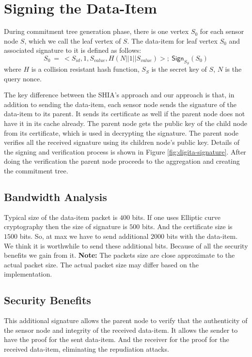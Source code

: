 \section{Signing the Data-Item}
	During commitment tree generation phase, there is one vertex $S_{0}$ for each sensor node $S$, which we call the leaf vertex of $S$.
	The data-item for leaf vertex $S_{0}$ and associated signature to it is defined as follows:
	\begin{equation}
		\label{eq:leaf-vertex}
		S_{0}\ =\ <S_{id}, 1, S_{value}, H(N||1||S_{value})>;\ 	\textsf{Sign}_{S_{S}}(S_{0})
	\end{equation}
	where $H$ is a collision resistant hash function, $S_{S}$ is the secret key of $S$, $N$ is the query nonce.

	The key difference between the SHIA's approach and our approach is that, in addition to sending the data-item, each sensor node sends the signature of the data-item to its parent.
	It sends its certificate as well if the parent node does not have it in its cache  already.
	The parent node gets the public key of the child node from its certificate, which is used in decrypting the signature. 
	The parent node verifies all the received signature using its children node's public key.
	Details of the signing and verification process is shown in Figure \ref{fig:digita-signature}.
	After doing the verification the parent node proceeds to the aggregation and creating the commitment tree.
	
	\subsection{Bandwidth Analysis}

	Typical size of the data-item packet is $400$ bits.
	If one uses Elliptic curve cryptography then the size of signature is $500$ bits.
	And the certificate size is $1500$ bits.
	So, at max we have to send additional $2000$ bits with the data-item.
	We think it is worthwhile to send these additional bits.
	Because of all the security benefits we gain from it. 
	\textbf{Note:} The packets size are close approximate to the actual packet size. 
	The actual packet size may differ based on the implementation.
	\subsection{Security Benefits}
	This additional signature allows the parent node to verify that the authenticity of the sensor node and integrity of the received data-item.
	It allows the sender to have the proof for the sent data-item.
	And the receiver for the proof for the received data-item, eliminating the repudiation attacks.

